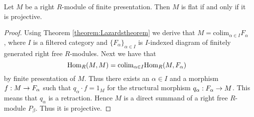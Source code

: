 \begin{corollary}
Let $M$ be a right $R$-module of finite presentation. Then $M$ is flat if and only if it is projective.
\end{corollary}
\begin{proof}
Using Theorem \ref{theorem:Lazardstheorem} we derive that $M=\mathrm{colim}_{\alpha \in I}F_{\alpha}$, where $I$ is a filtered category and $\{F_{\alpha}\}_{\alpha\in I}$ is $I$-indexed diagram of finitely generated right free $R$-modules. Next we have that
$$\mathrm{Hom}_R(M,M)=\mathrm{colim}_{\alpha\in I}\mathrm{Hom}_R(M,F_{\alpha})$$
by finite presentation of $M$. Thus there exists an $\alpha\in I$ and a morphism $f:M\rightarrow F_{\alpha}$ such that $q_{\alpha}\cdot f=1_M$ for the structural morphism $q_{\alpha}:F_{\alpha}\rightarrow M$. This means that $q_{\alpha}$ is a retraction. Hence $M$ is a direct summand of a right free $R$-module $P_{\beta}$. Thus it is projective.
\end{proof} 








































